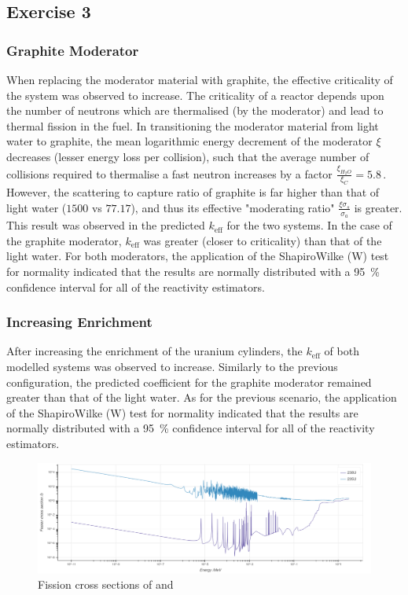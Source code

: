 \documentclass{article}
\begin{document}
  \subsection{Exercise 3}
    \subsubsection{Graphite Moderator}
    When replacing the moderator material with graphite, the effective criticality of the system was observed to increase. The criticality of a reactor depends upon the number of neutrons which are thermalised (by the moderator) and lead to thermal fission in the fuel. In transitioning the moderator material from light water to graphite, the mean logarithmic energy decrement of the moderator $\xi$ decreases (lesser energy loss per collision), such that the average number of collisions required to thermalise a fast neutron increases by a factor $\frac{\xi_{H_2O}}{\xi_{C}}=5.8\,.$
    However, the scattering to capture ratio of graphite is far higher than that of light water ($1500$ vs $77.17$), and thus its effective "moderating ratio" $\frac{\xi\sigma_{s}}{\sigma_{a}}$ is greater. This result was observed in the predicted $k_{\text{eff}}$ for the two systems. In the case of the graphite moderator,  $k_{\text{eff}}$ was greater (closer to criticality) than that of the light water.
    For both moderators, the application of the Shapiro\textendash Wilke (W) test for normality indicated that the results are normally distributed with a \SI{95}{\percent} confidence interval for all of the reactivity estimators.

    \subsubsection{Increasing Enrichment}
    After increasing the enrichment of the uranium cylinders, the $k_{\text{eff}}$ of both modelled systems was observed to increase. Similarly to the previous configuration, the predicted coefficient for the graphite moderator remained greater than that of the light water.
    As for the previous scenario, the application of the Shapiro\textendash Wilke (W) test for normality indicated that the results are normally distributed with a \SI{95}{\percent} confidence interval for all of the reactivity estimators.

    \begin{figure}
      \includegraphics[width=\textwidth]{cross_sections.png}
      \caption{Fission cross sections of  and }
      \label{fig:cross_sections}
    \end{figure}
\end{document}
